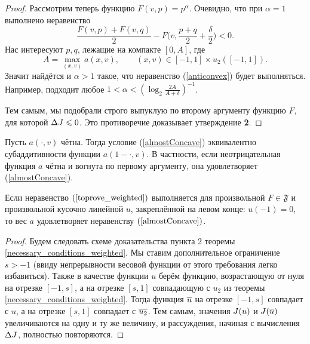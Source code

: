 \begin{proof}
Рассмотрим теперь функцию $F(v, p) = p^\alpha$.
Очевидно, что при $\alpha = 1$ выполнено неравенство
\begin{equation}
\label{anticonvex}
\frac{F(v, p) + F(v, q)}{ 2 } - F \bigl( v, \frac{p + q}{ 2 } + \frac{\delta}{ 2 } \bigr) < 0.
\end{equation}
Нас интересуют $p, q$, лежащие на компакте $[0, A]$, где
\begin{equation*}
A = \max \limits_{(x, v)} a(x, v), \qquad (x, v) \in [-1, 1 ] \times u_2([-1, 1] ).
\end{equation*}
Значит найдётся и $\alpha > 1$ такое, что неравенство (\ref{anticonvex}) будет выполняться.
Например, подходит любое $1 < \alpha < ( \log_2 \frac{2 A}{A + \delta} )^{-1}$.

Тем самым, мы подобрали строго выпуклую по второму аргументу функцию $F$, для которой $\Delta J \leqslant 0$.
Это противоречие доказывает утверждение \textbf{2}.
\end{proof}

\begin{rem}
Пусть $a(\cdot, v)$ чётна.
Тогда условие (\ref{almostConcave}) эквивалентно субаддитивности функции $a(1 - \cdot, v)$.
В частности, если неотрицательная функция $a$ чётна и вогнута по первому аргументу, она удовлетворяет (\ref{almostConcave}).
\end{rem}

\begin{thm}
\label{landesNecessaryRem}
Если неравенство $(\ref{toprove_weighted})$ выполняется для произвольной $F \in \mathfrak{F}$
и произвольной кусочно линейной $u$, закреплённой на левом конце: $u( -1 ) = 0$,
то вес $a$ удовлетворяет неравенству $(\ref{almostConcave})$.
\end{thm}

\begin{proof}
Будем следовать схеме доказательства пункта 2 теоремы \ref{necessary_conditions_weighted}.
Мы ставим дополнительное ограничение $s > -1$ (ввиду непрерывности весовой функции от этого требования легко избавиться).
Также в качестве функции $u$ берём функцию, возрастающую от нуля на отрезке $[-1, s]$,
а на отрезке $[s, 1]$ совпадающую с $u_2$ из теоремы \ref{necessary_conditions_weighted}.
Тогда функция $\mon{u}$ на отрезке $[-1, s]$ совпадает с $u$, а на отрезке $[s, 1]$ совпадает с $\mon{u_2}$.
Тем самым, значения $J(u)$ и $\IWg(\mon{u})$ увеличиваются на одну и ту же величину,
и рассуждения, начиная с вычисления $\Delta J$, полностью повторяются.
\end{proof}
